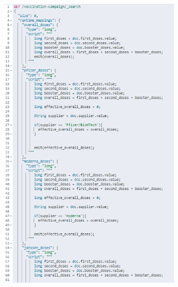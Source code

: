 \documentclass{article}[IEEEtran]
\begin{document}
\begin{figure}[H]
\begin{center}
\begin{minipage}[b]{0.4\textwidth}
    \includegraphics[width=0.8\textwidth, frame]{Query_2BIS_1.PNG}
    \subcaption{}
  \end{minipage}
  \hfill  
\begin{minipage}[b]{0.4\textwidth}

\end{minipage}
\end{center}
\end{figure}
\end{document}
